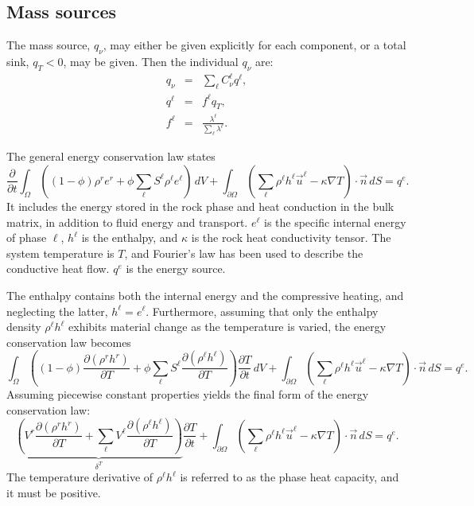 
\subsection{Mass sources}

The mass source, $q_\nu$, may either be given explicitly for each
component, or a total sink, $q_T<0$, may be given. Then the individual
$q_\nu$ are:
\begin{eqnarray}
  q_\nu & = & \sum_\ell C_\nu^\ell q^\ell, \\
  q^\ell & = & f^\ell q_T, \\
  f^\ell & = & \frac{\lambda^\ell}{\sum_\ell \lambda^\ell}.
\end{eqnarray}



The general energy conservation law states \cite{allen1988,welty1984}
\begin{equation}
  \frac{\partial}{\partial t}
  \int_\Omega\left(
    (1-\phi)\rho^r e^r +
    \phi \sum_\ell S^\ell \rho^\ell e^\ell
  \right)\, dV +
  \int_{\partial\Omega} \left(
    \sum_\ell \rho^\ell h^\ell \vec u^\ell -
    \kappa\nabla T
  \right)\cdot\vec n\, dS = q^e.
\end{equation}
It includes the energy stored in the rock phase and heat conduction in
the bulk matrix, in addition to fluid energy and transport. $e^\ell$
is the specific internal energy of phase $\ell$, $h^\ell$ is the
enthalpy, and $\kappa$ is the rock heat conductivity tensor. The
system temperature is $T$, and Fourier's law has been used to describe
the conductive heat flow. $q^e$ is the energy source.

The enthalpy contains both the internal energy and the compressive
heating, and neglecting the latter, $h^\ell=e^\ell$. Furthermore,
assuming that only the enthalpy density $\rho^\ell h^\ell$ exhibits
material change as the temperature is varied, the energy conservation
law becomes
\begin{equation}
  \int_\Omega\left(
    (1-\phi) \frac{\partial\left(\rho^r h^r\right)}{\partial T} +
    \phi\sum_\ell
    S^\ell \frac{\partial\left(\rho^\ell h^\ell\right)}{\partial T}
  \right)\frac{\partial T}{\partial t}\, dV +
  \int_{\partial\Omega} \left(
    \sum_\ell \rho^\ell h^\ell \vec u^\ell -
    \kappa\nabla T
  \right)\cdot\vec n\, dS = q^e.
\end{equation}
Assuming piecewise constant properties yields the final form of the
energy conservation law:
\begin{equation}
  \underbrace{\left(
      V^r \frac{\partial\left(\rho^r h^r\right)}{\partial T} +
      \sum_\ell
      V^\ell \frac{\partial\left(\rho^\ell h^\ell\right)}{\partial T}
    \right)}_{\delta^T}\frac{\partial T}{\partial t} +
  \int_{\partial\Omega} \left(
    \sum_\ell \rho^\ell h^\ell \vec u^\ell -
    \kappa\nabla T
  \right)\cdot\vec n\, dS = q^e.
\end{equation}
The temperature derivative of $\rho^\ell h^\ell$ is referred to as the
phase heat capacity, and it must be positive.

